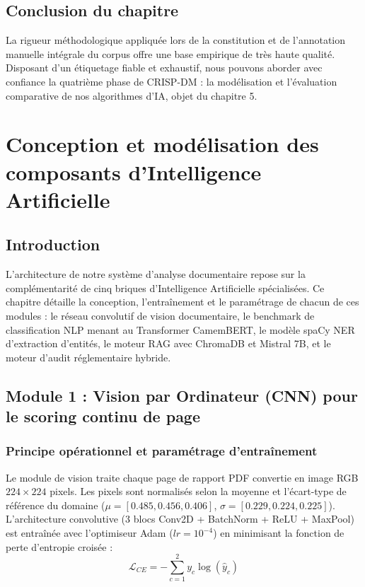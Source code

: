 \documentclass[12pt,a4paper]{report}
\begin{document}
\section{Conclusion du chapitre}
La rigueur méthodologique appliquée lors de la constitution et de l'annotation manuelle intégrale du corpus offre une base empirique de très haute qualité. Disposant d'un étiquetage fiable et exhaustif, nous pouvons aborder avec confiance la quatrième phase de CRISP-DM : la modélisation et l'évaluation comparative de nos algorithmes d'IA, objet du chapitre 5.

\newpage

\chapter{Conception et modélisation des composants d'Intelligence Artificielle}

\section{Introduction}
L'architecture de notre système d'analyse documentaire repose sur la complémentarité de cinq briques d'Intelligence Artificielle spécialisées. Ce chapitre détaille la conception, l'entraînement et le paramétrage de chacun de ces modules : le réseau convolutif de vision documentaire, le benchmark de classification NLP menant au Transformer CamemBERT, le modèle spaCy NER d'extraction d'entités, le moteur RAG avec ChromaDB et Mistral 7B, et le moteur d'audit réglementaire hybride.

\section{Module 1 : Vision par Ordinateur (CNN) pour le scoring continu de page}

\subsection{Principe opérationnel et paramétrage d'entraînement}
Le module de vision traite chaque page de rapport PDF convertie en image RGB $224 \times 224$ pixels. Les pixels sont normalisés selon la moyenne et l'écart-type de référence du domaine ($\mu = [0.485, 0.456, 0.406]$, $\sigma = [0.229, 0.224, 0.225]$). L'architecture convolutive (3 blocs Conv2D + BatchNorm + ReLU + MaxPool) est entraînée avec l'optimiseur Adam ($lr = 10^{-4}$) en minimisant la fonction de perte d'entropie croisée :
\begin{equation}
    \mathcal{L}_{CE} = - \sum_{c=1}^2 y_c \log(\hat{y}_c)
\end{equation}
\end{document}

